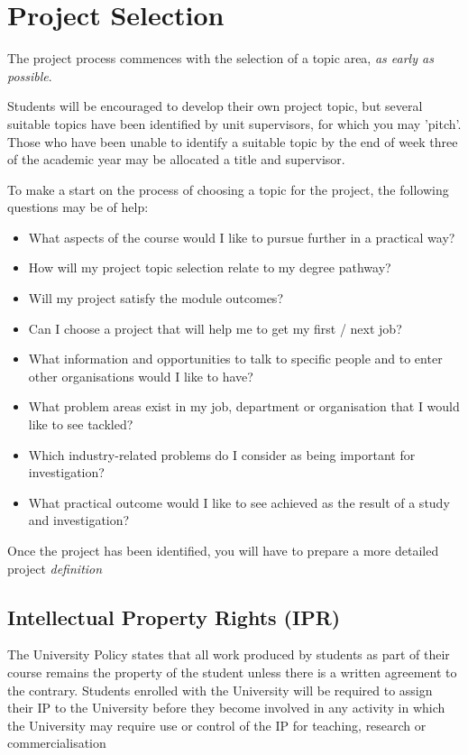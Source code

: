 \chapter{Project Selection}

The project process commences with the selection of a topic area, \textit{as early as possible}.

\begin{tcolorbox}
    Students will be encouraged to develop their own project topic, but several suitable topics have been identified by unit supervisors, for which you may 'pitch’. Those who have been unable to identify a suitable topic by the end of week three of the academic year may be allocated a title and supervisor.
\end{tcolorbox}
    
To make a start on the process of choosing a topic for the project, the following questions may be of help:

\begin{itemize}
    \item What aspects of the course would I like to pursue further in a practical way?
    \item How will my project topic selection relate to my degree pathway?
    \item Will my project satisfy the module outcomes?
    \item Can I choose a project that will help me to get my first / next job?
    \item What information and opportunities to talk to specific people and to enter other organisations would I like to have?
    \item What problem areas exist in my job, department or organisation that I would like to see tackled?
    \item Which industry-related problems do I consider as being important for investigation?
    \item What practical outcome would I like to see achieved as the result of a study and investigation?
\end{itemize}

Once the project has been identified, you will have to prepare a more detailed project \textit{definition}

\section{Intellectual Property Rights (IPR)}

The University Policy states that all work produced by students as part of their course remains the property of the student unless there is a written agreement to the contrary. Students enrolled with the University will be required to assign their IP to the University before they become involved in any activity in which the University may require use or control of the IP for teaching, research or commercialisation

